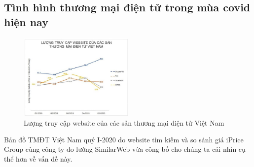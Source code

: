 \documentclass[12pt]{article}
\begin{document}
\subsection{Tình hình thương mại điện tử trong mùa covid hiện nay}
\begin{figure}[h]
\centering
\includegraphics[width=0.5\textwidth]{image/tmdt.JPG}
\caption{\label{fig:tmdt} Lượng truy cập website của các sản thương mại điện tử Việt Nam}
\end{figure}
Bản đồ TMĐT Việt Nam quý I-2020 do website tìm kiếm và so sánh giá iPrice Group cùng công ty đo lường SimilarWeb vừa công bố cho chúng ta cái nhìn cụ thể hơn về vấn đề này.
\end{document}
